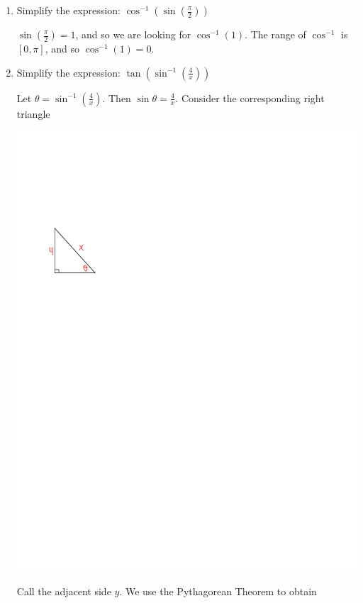 \documentclass[handout,nooutcomes]{ximera}
\begin{document}
			
			
\begin{problem}
	
			\begin{enumerate}
			
			\item  Simplify the expression:  $\cos^{-1} \left( \sin \left( \frac{\pi }{2} \right) \right) $ 
			
			 \begin{freeResponse}			 
			 $ \sin \left( \frac{\pi}{2} \right) = 1$, and so we are looking for $\cos^{-1}(1)$.  The range of $\cos^{-1}$ is $[0, \pi]$, and so $\cos^{-1} (1) = 0$.  
			 \end{freeResponse}
			 
			 
			 
			 
			 
			 
			
			\item  Simplify the expression:  $ \tan \left( \sin^{-1} \left( \frac{4}{x} \right) \right) $ 
			
			 \begin{freeResponse}			 
			 Let $\theta = \sin^{-1} \left( \frac{4}{x} \right) $.  Then $\sin \theta = \frac{4}{x}$.  Consider the corresponding right triangle
			 
			 \begin{image}
			 \includegraphics[trim=60 525 300 170]{Figure5.pdf}
			 \end{image}
			 Call the adjacent side $y$.  We use the Pythagorean Theorem to obtain
			

\end{freeResponse}
\end{enumerate}
\end{problem}
\end{document}
